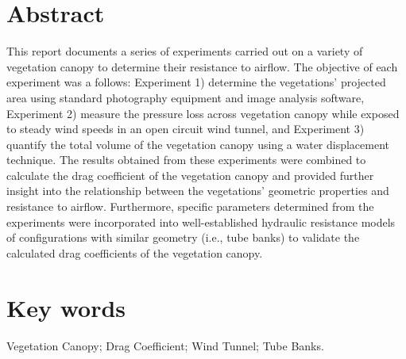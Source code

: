 \documentclass[12pt]{article}
\begin{document}
\section*{Abstract}
\normalsize This report documents a series of experiments carried out on a variety of vegetation canopy to determine their resistance to airflow. The objective of each experiment was a follows: Experiment 1) determine the vegetations' projected area using standard photography equipment and image analysis software, Experiment 2) measure the pressure loss across vegetation canopy while exposed to steady wind speeds in an open circuit wind tunnel, and Experiment 3) quantify the total volume of the vegetation canopy using a water displacement technique. The results obtained from these experiments were combined to calculate the drag coefficient of the vegetation canopy and provided further insight into the relationship between the vegetations' geometric properties and resistance to airflow. Furthermore, specific parameters determined from the experiments were incorporated into well-established hydraulic resistance models of configurations with similar geometry (i.e., tube banks) to validate the calculated drag coefficients of the vegetation canopy. \\ 
\section*{Key words}
\normalsize Vegetation Canopy; Drag Coefficient; Wind Tunnel; Tube Banks.\\
\pagebreak
\begin{center}
	\tableofcontents
	\listoftables
	\listoffigures
\end{center}
\pagebreak
\end{document}
